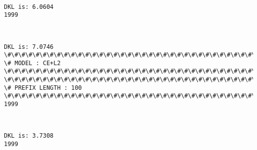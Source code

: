 \documentclass[11pt]{article}
\begin{document}
    \begin{center}
    \end{center}
    { \hspace*{\fill} \\}
    
    \begin{Verbatim}[commandchars=\\\{\}]
DKL is: 6.0604
1999

    \end{Verbatim}

    \begin{center}
    \end{center}
    { \hspace*{\fill} \\}
    
    \begin{Verbatim}[commandchars=\\\{\}]
DKL is: 7.0746
\#\#\#\#\#\#\#\#\#\#\#\#\#\#\#\#\#\#\#\#\#\#\#\#\#\#\#\#\#\#\#\#\#\#\#\#\#\#\#\#\#\#\#\#\#\#\#\#\#\#\#\#\#\#\#\#\#\#\#\#\#\#\#\#\#\#\#\#\#\#\#\#\#\#\#\#
\# MODEL : CE+L2
\#\#\#\#\#\#\#\#\#\#\#\#\#\#\#\#\#\#\#\#\#\#\#\#\#\#\#\#\#\#\#\#\#\#\#\#\#\#\#\#\#\#\#\#\#\#\#\#\#\#\#\#\#\#\#\#\#\#\#\#\#\#\#\#\#\#\#\#\#\#\#\#\#\#\#\#
\#\#\#\#\#\#\#\#\#\#\#\#\#\#\#\#\#\#\#\#\#\#\#\#\#\#\#\#\#\#\#\#\#\#\#\#\#\#\#\#\#\#\#\#\#\#\#\#\#\#\#\#\#\#\#\#\#\#\#\#\#\#\#\#\#\#\#\#\#\#\#\#\#\#\#\#
\# PREFIX LENGTH : 100
\#\#\#\#\#\#\#\#\#\#\#\#\#\#\#\#\#\#\#\#\#\#\#\#\#\#\#\#\#\#\#\#\#\#\#\#\#\#\#\#\#\#\#\#\#\#\#\#\#\#\#\#\#\#\#\#\#\#\#\#\#\#\#\#\#\#\#\#\#\#\#\#\#\#\#\#
1999

    \end{Verbatim}

    \begin{center}
    \end{center}
    { \hspace*{\fill} \\}
    
    \begin{Verbatim}[commandchars=\\\{\}]
DKL is: 3.7308
1999

    \end{Verbatim}

    \begin{center}
    \end{center}
    { \hspace*{\fill} \\}
    
\end{document}
